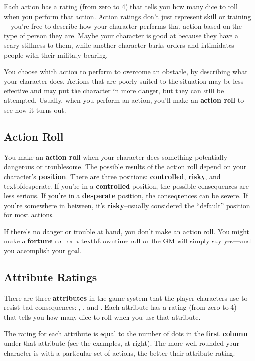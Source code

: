 Each action has a rating (from zero to 4) that tells you how many dice to roll when you perform that action. Action ratings don’t just represent skill or training—you’re free to describe how your character performs that action based on the type of person they are. Maybe your character is good at  because they have a scary stillness to them, while another character barks orders and intimidates people with their military bearing.

You choose which action to perform to overcome an obstacle, by describing what your character does. Actions that are poorly suited to the situation may be less effective and may put the character in more danger, but they can still be attempted. Usually, when you perform an action, you’ll make an \textbf{action roll} to see how it turns out.

\subsection{Action Roll}

You make an \textbf{action roll} when your character does something potentially dangerous or troublesome. The possible results of the action roll depend on your character’s \textbf{position}. There are three positions: \textbf{controlled}, \textbf{risky}, and textbf{desperate}. If you’re in a \textbf{controlled} position, the possible consequences are less serious. If you’re in a \textbf{desperate} position, the consequences can be severe. If you’re somewhere in between, it’s \textbf{risky}--usually considered the ``default'' position for most actions.

If there’s no danger or trouble at hand, you don’t make an action roll. You might make a \textbf{fortune} roll or a textbf{downtime} roll or the GM will simply say yes—and you accomplish your goal.

\subsection{Attribute Ratings}

There are three \textbf{attributes} in the game system that the player characters use to resist bad consequences: , , and . Each attribute has a rating (from zero to 4) that tells you how many dice to roll when you use that attribute.

The rating for each attribute is equal to the number of dots in the \textbf{first column} under that attribute (see the examples, at right). The more well-rounded your character is with a particular set of actions, the better their attribute rating.

